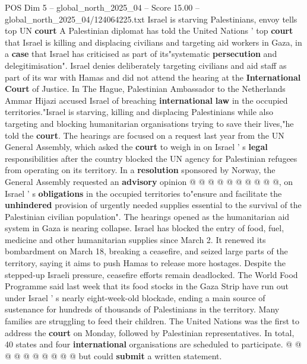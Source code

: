 \begin{textsample}{POS Dim 5 – global\_north\_2025\_04 – Score 15.00 – global\_north\_2025\_04/124064225.txt}  \label{ex:f5_pos_096}
Israel is starving Palestinians, envoy tells top UN \textbf{court} A Palestinian diplomat has told the United Nations ' top \textbf{court} that Israel is killing and displacing civilians and targeting aid workers in Gaza, in a \textbf{case} that Israel has criticised as part of its"systematic \textbf{persecution} and delegitimisation".
Israel denies deliberately targeting civilians and aid staff as part of its war with Hamas and did not attend the hearing at the \textbf{International} \textbf{Court} of Justice.
In The Hague, Palestinian Ambassador to the Netherlands Ammar Hijazi accused Israel of breaching \textbf{international} \textbf{law} in the occupied territories."Israel is starving, killing and displacing Palestinians while also targeting and blocking humanitarian organisations trying to save their lives,"he told the \textbf{court}.
The hearings are focused on a request last year from the UN General Assembly, which asked the \textbf{court} to weigh in on Israel ' s \textbf{legal} responsibilities after the country blocked the UN agency for Palestinian refugees from operating on its territory.
In a \textbf{resolution} sponsored by Norway, the General Assembly requested an \textbf{advisory} opinion @ @ @ @ @ @ @ @ @ @, on Israel ' s \textbf{obligations} in the occupied territories to"ensure and facilitate the \textbf{unhindered} provision of urgently needed supplies essential to the survival of the Palestinian civilian population".
The hearings opened as the humanitarian aid system in Gaza is nearing collapse.
Israel has blocked the entry of food, fuel, medicine and other humanitarian supplies since March 2.
It renewed its bombardment on March 18, breaking a ceasefire, and seized large parts of the territory, saying it aims to push Hamas to release more hostages.
Despite the stepped-up Israeli pressure, ceasefire efforts remain deadlocked.
The World Food Programme said last week that its food stocks in the Gaza Strip have run out under Israel ' s nearly eight-week-old blockade, ending a main source of sustenance for hundreds of thousands of Palestinians in the territory.
Many families are struggling to feed their children.
The United Nations was the first to address the \textbf{court} on Monday, followed by Palestinian representatives.
In total, 40 states and four \textbf{international} organisations are scheduled to participate. @ @ @ @ @ @ @ @ @ @ but could \textbf{submit} a written statement.

\end{textsample}
